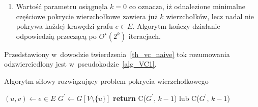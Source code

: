 {\begin{bproof}
\begin{enumerate}
      \item Wartość parametru osiągnęła $k=0$ co oznacza, iż odnalezione minimalne częściowe pokrycie wierzchołkowe zawiera już $k$ wierzchołków, lecz nadal nie pokrywa każdej krawędzi grafu $e \in E$.
      Algorytm kończy działanie odpowiedzią przeczącą po $O^\star(2^k)$ iteracjach.
    \end{enumerate}
  \end{bproof}
  Przedstawiony w~dowodzie twierdzenia~\ref{th_vc_naive} tok rozumowania odzwierciedlony jest w~pseudokodzie~\ref{alg_VC1}.
  \begin{algorithm}
    \caption{Algorytm siłowy rozwiązujący problem pokrycia wierzchołkowego}\label{alg_VC1}
    \begin{algorithmic}[1]



        \EndIf
        \EndIf
        \State $(u,v) \leftarrow e \in E$
        \State $G^\prime \gets G[V\setminus \{u\}]$
        \State \textbf{return} {C($G^\prime$, $k-1$) lub C($G^\prime$, $k-1$)}
      \EndFunction
    \end{algorithmic}
  \end{algorithm}
}
